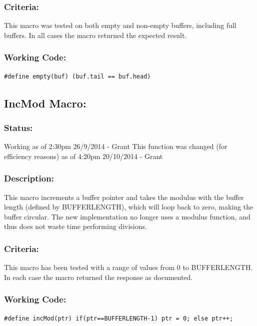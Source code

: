 \documentclass[]{report}
\begin{document}
\subsubsection{Criteria:}
This macro was tested on both empty and non-empty buffers, including full buffers. In all cases the macro returned the expected result.

\subsubsection{Working Code:}
\begin{lstlisting}
#define empty(buf) (buf.tail == buf.head)
\end{lstlisting}

\subsection{IncMod Macro:}
\subsubsection{Status:}
Working as of 2:30pm 26/9/2014 - Grant\newline
This function was changed (for efficiency reasons) as of 4:20pm 20/10/2014 - Grant

\subsubsection{Description:}
This macro increments a buffer pointer and takes the modulus with the buffer length (defined by BUFFERLENGTH), which will loop back to zero, making the buffer circular. \newline
The new implementation no longer uses a modulus function, and thus does not waste time performing divisions.

\subsubsection{Criteria:}
This macro has been tested with a range of values from 0 to BUFFERLENGTH. In each case the macro returned the response as documented.

\subsubsection{Working Code:}
\begin{lstlisting}
#define incMod(ptr) if(ptr==BUFFERLENGTH-1) ptr = 0; else ptr++;
\end{lstlisting}
\end{document}

